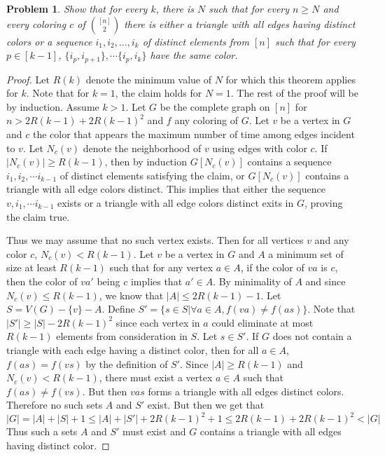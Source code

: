 \documentclass[12pt]{article}
\newtheorem{problem}{Problem}
\begin{document}
\begin{problem} Show that for every $k$, there is $N$ such that for
  every $n \geq N$ and every coloring $c$ of ${[n]\choose 2}$ there is
  either a triangle with all edges having distinct colors or a
  sequence $i_1, i_2, \ldots, i_k$ of distinct elements from $[n]$
  such that for every $p \in [k - 1]$,
  $\{i_p, i_{p+1}\}, \cdots \{i_p, i_k\}$ have the same color.
\end{problem}
\begin{proof} Let $R(k)$ denote the minimum value of $N$ for which
  this theorem applies for $k$. Note that for $k = 1$, the claim holds
  for $N = 1$. The rest of the proof will be by induction. Assume
  $k > 1$. Let $G$ be the complete graph on $[n]$ for
  $n > 2R(k-1) + 2{R(k-1)}^2$ and $f$ any coloring of $G$. Let $v$ be
  a vertex in $G$ and $c$ the color that appears the maximum number of
  time among edges incident to $v$. Let $N_c(v)$ denote the
  neighborhood of $v$ using edges with color $c$. If
  $|N_c(v)| \geq R(k-1)$, then by induction $G[N_c(v)]$ contains a
  sequence $i_1, i_2, \cdots i_{k-1}$ of distinct elements satisfying
  the claim, or $G[N_c(v)]$ contains a triangle with all edge colors
  distinct. This implies that either the sequence
  $v, i_1, \cdots i_{k -1}$ exists or a triangle with all edge colors
  distinct exits in $G$, proving the claim true.

  Thus we may assume that no such vertex exists. Then for all vertices
  $v$ and any color $c$, $N_c(v) < R(k-1)$. Let $v$ be a vertex in $G$
  and $A$ a minimum set of size at least $R(k - 1)$ such that for any
  vertex $a \in A$, if the color of $va$ is $c$, then the color of
  $va'$ being $c$ implies that $a' \in A$. By minimality of $A$ and
  since $N_c(v) \leq R(k-1)$, we know that $|A| \leq 2R(k-1) - 1$. Let
  $S = V(G) - \{v\} - A$. Define
  $S' = \{s \in S | \forall a \in A, f(va) \neq f(as)\}$. Note that
  $|S'| \geq |S| - 2{R(k-1)}^2$ since each vertex in $a$ could
  eliminate at most $R(k-1)$ elements from consideration in $S$. Let
  $s \in S'$. If $G$ does not contain a triangle with each edge having
  a distinct color, then for all $a \in A$, $f(as) = f(vs)$ by the
  definition of $S'$. Since $|A| \geq R(k - 1)$ and $N_c(v) < R(k-1)$,
  there must exist a vertex $a \in A$ such that $f(as) \neq
  f(vs)$. But then $vas$ forms a triangle with all edges distinct
  colors. Therefore no such sets $A$ and $S'$ exist. But then we get
  that
  \[
    |G| =|A| + |S| + 1 \leq |A| + |S'| + 2{R(k-1)}^2 + 1 \leq 2R(k-1)
    + 2{R(k-1)}^2 < |G|
  \]
  Thus such a sets $A$ and $S'$ must exist and $G$ contains a triangle
  with all edges having distinct color.
\end{proof}
\end{document}

